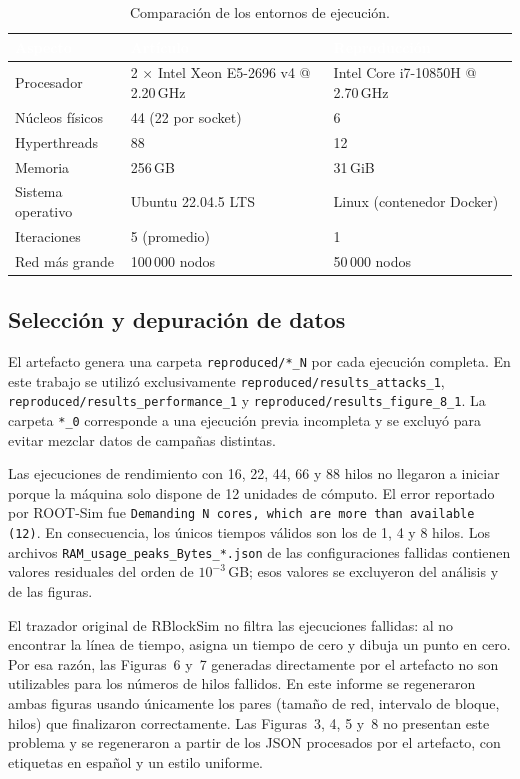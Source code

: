 \documentclass[11pt,a4paper,oneside]{article}
\begin{document}
\begin{table}[H]
\caption{Comparación de los entornos de ejecución.}
\label{tab:entorno}
\centering
\small
\renewcommand{\arraystretch}{1.15}
\begin{tabularx}{\textwidth}{lXX}
\toprule
\rowcolor{tablehead}
\textcolor{white}{\textbf{Aspecto}} &
\textcolor{white}{\textbf{Artículo}} &
\textcolor{white}{\textbf{Reproducción}} \\
\midrule
Procesador & 2 $\times$ Intel Xeon E5-2696 v4 @ 2.20\,GHz & Intel Core i7-10850H @ 2.70\,GHz \\
Núcleos físicos & 44 (22 por socket) & 6 \\
Hyperthreads & 88 & 12 \\
Memoria & 256\,GB & 31\,GiB \\
Sistema operativo & Ubuntu 22.04.5 LTS & Linux (contenedor Docker) \\
Iteraciones & 5 (promedio) & 1 \\
Red más grande & 100\,000 nodos & 50\,000 nodos \\
\bottomrule
\end{tabularx}
\end{table}

\subsection{Selección y depuración de datos}

El artefacto genera una carpeta \texttt{reproduced/*\_N} por cada ejecución completa. En este trabajo se utilizó exclusivamente \texttt{reproduced/results\_attacks\_1}, \texttt{reproduced/results\_performance\_1} y \texttt{reproduced/results\_figure\_8\_1}. La carpeta \texttt{*\_0} corresponde a una ejecución previa incompleta y se excluyó para evitar mezclar datos de campañas distintas.

Las ejecuciones de rendimiento con 16, 22, 44, 66 y 88 hilos no llegaron a iniciar porque la máquina solo dispone de 12 unidades de cómputo. El error reportado por ROOT-Sim fue \texttt{Demanding N cores, which are more than available (12)}. En consecuencia, los únicos tiempos válidos son los de 1, 4 y 8 hilos. Los archivos \texttt{RAM\_usage\_peaks\_Bytes\_*.json} de las configuraciones fallidas contienen valores residuales del orden de $10^{-3}$\,GB; esos valores se excluyeron del análisis y de las figuras.

El trazador original de RBlockSim no filtra las ejecuciones fallidas: al no encontrar la línea de tiempo, asigna un tiempo de cero y dibuja un punto en cero. Por esa razón, las Figuras~6 y~7 generadas directamente por el artefacto no son utilizables para los números de hilos fallidos. En este informe se regeneraron ambas figuras usando únicamente los pares (tamaño de red, intervalo de bloque, hilos) que finalizaron correctamente. Las Figuras~3, 4, 5 y~8 no presentan este problema y se regeneraron a partir de los JSON procesados por el artefacto, con etiquetas en español y un estilo uniforme.
\end{document}
